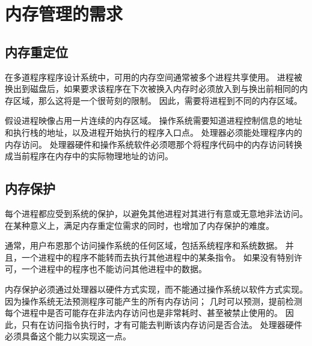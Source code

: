 
\section{内存管理的需求}
{
    \subsection{内存重定位}
    {
        在多道程序程序设计系统中，可用的内存空间通常被多个进程共享使用。
        进程被换出到磁盘后，如果要求该程序在下次被换入内存时必须放入到与换出前相同的内存区域，那么这将是一个很苛刻的限制。
        因此，需要将进程到不同的内存区域。

        假设进程映像占用一片连续的内存区域。
        操作系统需要知道进程控制信息的地址和执行栈的地址，以及进程开始执行的程序入口点。
        处理器必须能处理程序内的内存访问。
        处理器硬件和操作系统软件必须嗯那个将程序代码中的内存访问转换成当前程序在内存中的实际物理地址的访问。
    }

    \subsection{内存保护}
    {
        每个进程都应受到系统的保护，以避免其他进程对其进行有意或无意地非法访问。
        在某种意义上，满足内存重定位需求的同时，也增加了内存保护的难度。

        通常，用户布恩那个访问操作系统的任何区域，包括系统程序和系统数据。
        并且，一个进程中的程序不能转而去执行其他进程中的某条指令。
        如果没有特别许可，一个进程中的程序也不能访问其他进程中的数据。

        内存保护必须通过处理器以硬件方式实现，而不能通过操作系统以软件方式实现。
        因为操作系统无法预测程序可能产生的所有内存访问；
        几时可以预测，提前检测每个进程中是否可能存在非法内存访问也是非常耗时、甚至被禁止使用的。
        因此，只有在访问指令执行时，才有可能去判断该内存访问是否合法。
        处理器硬件必须具备这个能力以实现这一点。
    }
}
